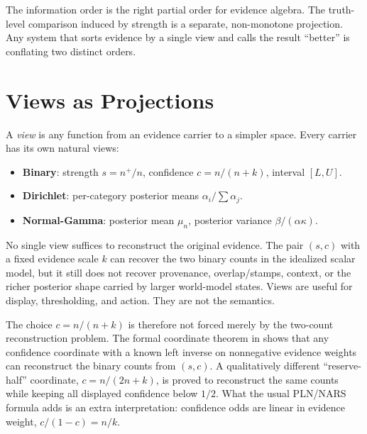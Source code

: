 \documentclass[11pt,openany]{report}
\begin{document}
\noindent
The information order is the right partial order for evidence algebra.
The truth-level comparison induced by strength is a separate,
non-monotone projection.  Any system that sorts evidence by a single
view and calls the result ``better'' is conflating two distinct orders.


\section{Views as Projections}

A \emph{view} is any function from an evidence carrier to a simpler
space.  Every carrier has its own natural views:

\begin{itemize}
\item \textbf{Binary}: strength $s = n^+/n$, confidence
  $c = n/(n+k)$, interval $[L, U]$.
\item \textbf{Dirichlet}: per-category posterior means
  $\alpha_i / \sum \alpha_j$.
\item \textbf{Normal-Gamma}: posterior mean $\mu_n$, posterior
  variance $\beta / (\alpha \kappa)$.
\end{itemize}

\noindent
No single view suffices to reconstruct the original evidence.  The
pair $(s,c)$ with a fixed evidence scale $k$ can recover the two
binary counts in the idealized scalar model, but it still does not
recover provenance, overlap/stamps, context, or the richer posterior
shape carried by larger world-model states.  Views are useful for
display, thresholding, and action.  They are not the semantics.

The choice $c=n/(n+k)$ is therefore not forced merely by the
two-count reconstruction problem.  The formal coordinate theorem in
 shows that any
confidence coordinate with a known left inverse on nonnegative evidence
weights can reconstruct the binary counts from $(s,c)$.  A qualitatively
different ``reserve-half'' coordinate, $c=n/(2n+k)$, is proved to reconstruct
the same counts while keeping all displayed confidence below $1/2$.
What the usual PLN/NARS formula adds is an extra interpretation:
confidence odds are linear in evidence weight,
$c/(1-c)=n/k$.
\end{document}

